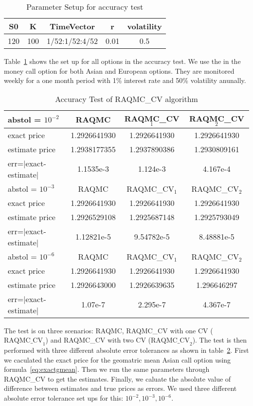 \begin{table}[h]
    \centering
	\caption{Parameter Setup for accuracy test}
    \label{tb:accsetup}
	\begin{tabular}{ccccc}
		\hline\hline
        S0 & K & TimeVector & r & volatility \\[0.5ex]
        \hline
        120  & 100 & 1/52:1/52:4/52 & 0.01 & 0.5 \\[1ex] 
        \hline
	\end{tabular}
\end{table}
Table~\ref{tb:accsetup} shows the set up for all options in the accuracy test.
We use the in the money call option for both Asian and European options. 
They are monitored weekly for a one month period with 1\% interest rate and 50\% volatility anunally. 
\begin{table}[h]
    \centering
	\caption{Accuracy Test of RAQMC\_CV algorithm}
    \label{tb:accuracy}
    \begin{tabular}{lccc}  
    \hline \hline
    abstol = $10^{-2}$ &RAQMC&RAQMC\_CV$_1$&RAQMC\_CV$_2$\\[0.5ex]
    \hline
    exact price& 1.2926641930& 1.2926641930&1.2926641930\\[0.5ex]
    estimate price& 1.2938177355& 1.2937890386&1.2930809161\\[0.5ex]
    err=$|$exact-estimate$|$ & 1.1535e-3& 1.124e-3&4.167e-4\\[0.5ex]
    \hline
    abstol = $10^{-3}$ &RAQMC&RAQMC\_CV$_1$&RAQMC\_CV$_2$\\[0.5ex]
    \hline
    exact price& 1.2926641930& 1.2926641930&1.2926641930\\[0.5ex]
    estimate price& 1.2926529108& 1.2925687148&1.2925793049\\[0.5ex]
    err=$|$exact-estimate$|$ & 1.12821e-5& 9.54782e-5&8.48881e-5\\[0.5ex]
    \hline
    abstol = $10^{-6}$ & RAQMC&RAQMC\_CV$_1$&RAQMC\_CV$_2$\\[0.5ex]
    \hline
    exact price& 1.2926641930& 1.2926641930&1.2926641930\\[0.5ex]
    estimate price& 1.2926643000& 1.2926639635&1.296646297\\[0.5ex]
    err=$|$exact-estimate$|$ & 1.07e-7& 2.295e-7&4.367e-7\\[0.5ex]
    \hline
    \end{tabular}
\end{table}
The test is on three scenarios: RAQMC, RAQMC\_CV with one CV ($\textrm{RAQMC\_CV}_1$) and RAQMC\_CV with two CV ($\textrm{RAQMC\_CV}_2$).
The test is then performed with three different absolute error tolerances as shown in table~\ref{tb:accuracy}.
First we caculated the exact price for the geomatric mean Asian call option using formula~\eqref{eq:exactgmean}. 
Then we run the same parameters through RAQMC\_CV to get the estimates. 
Finally, we caluate the absolute value of difference between estimates and true prices as errors. 
We used three different absolute error tolerance set ups for this: $10^{-2}, 10^{-3}, 10^{-6}$.   

